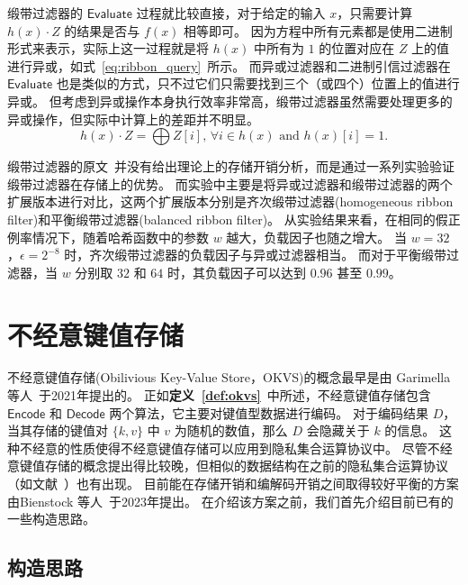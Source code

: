 缎带过滤器的 $\mathsf{Evaluate}$ 过程就比较直接，对于给定的输入 $x$，只需要计算 $h(x)\cdot Z$ 的结果是否与 $f(x)$ 相等即可。
因为方程中所有元素都是使用二进制形式来表示，实际上这一过程就是将 $h(x)$ 中所有为 $1$ 的位置对应在 $Z$ 上的值进行异或，如式~\ref{eq:ribbon_query}~所示。
而异或过滤器和二进制引信过滤器在 $\mathsf{Evaluate}$ 也是类似的方式，只不过它们只需要找到三个（或四个）位置上的值进行异或。
但考虑到异或操作本身执行效率非常高，缎带过滤器虽然需要处理更多的异或操作，但实际中计算上的差距并不明显。
\begin{equation}
  h(x) \cdot Z = \bigoplus Z[i] \mbox{, } \forall i \in h(x) \mbox{ and } h(x)[i] = 1.
  \label{eq:ribbon_query}
\end{equation}

缎带过滤器的原文~\cite{dillinger2021ribbon}并没有给出理论上的存储开销分析，而是通过一系列实验验证缎带过滤器在存储上的优势。
而实验中主要是将异或过滤器和缎带过滤器的两个扩展版本进行对比，这两个扩展版本分别是齐次缎带过滤器(homogeneous ribbon filter)和平衡缎带过滤器(balanced ribbon filter)。
从实验结果来看，在相同的假正例率情况下，随着哈希函数中的参数 $w$ 越大，负载因子也随之增大。
当 $w=32$，$\epsilon=2^{-8}$ 时，齐次缎带过滤器的负载因子与异或过滤器相当。
而对于平衡缎带过滤器，当 $w$ 分别取 $32$ 和 $64$ 时，其负载因子可以达到 $0.96$ 甚至 $0.99$。

\section{不经意键值存储}

不经意键值存储(Obilivious Key-Value Store，OKVS)的概念最早是由 Garimella 等人~\cite{garimella2021oblivious}于2021年提出的。
正如\textbf{定义~\ref{def:okvs}}~中所述，不经意键值存储包含 $\mathsf{Encode}$ 和 $\mathsf{Decode}$ 两个算法，它主要对键值型数据进行编码。
对于编码结果 $D$，当其存储的键值对 $\{k, v\}$ 中 $v$ 为随机的数值，那么 $D$ 会隐藏关于 $k$ 的信息。
这种不经意的性质使得不经意键值存储可以应用到隐私集合运算协议中。
尽管不经意键值存储的概念提出得比较晚，但相似的数据结构在之前的隐私集合运算协议（如文献~\cite{dong2013when,pinkas2020psi}）也有出现。
目前能在存储开销和编解码开销之间取得较好平衡的方案由Bienstock 等人~\cite{bienstock2023NearOptimal}于2023年提出。
在介绍该方案之前，我们首先介绍目前已有的一些构造思路。

\subsection{构造思路}

